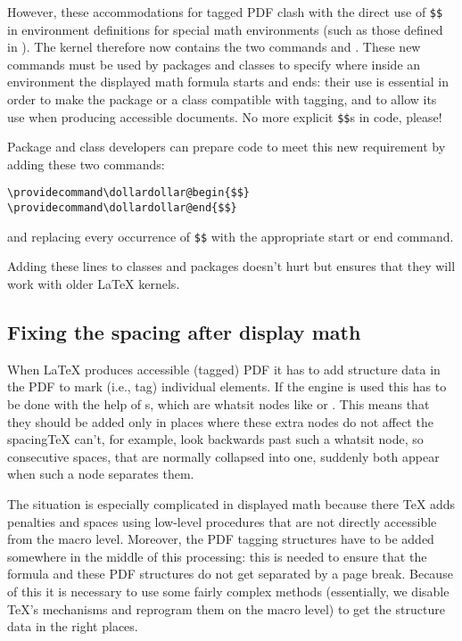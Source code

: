 \documentclass{ltnews}
\providecommand\Dash {\unskip \textemdash}
\providecommand\pdfTeX{\hologo{pdfTeX}}
\begin{document}
However, these accommodations for tagged PDF clash with the direct use
of \verb=$$= in environment definitions for special math environments
(such as those defined in ).  The kernel therefore now
contains the two commands  and
.  These new commands must be used by packages
and classes to specify where inside an environment the displayed math
formula starts and ends: their use is essential in order to make the
package or a class compatible with tagging, and to allow its use when
producing accessible documents.
%
No more explicit \texttt{\$\$}s in
code, please!

Package and class developers can prepare code to meet
this new requirement by adding these two commands:
\begin{verbatim}
\providecommand\dollardollar@begin{$$}
\providecommand\dollardollar@end{$$}
\end{verbatim}
and replacing every occurrence of \verb=$$= with the appropriate start
or end command.

Adding these  lines to classes and packages doesn't
hurt but ensures that they will work with older \LaTeX{} kernels.



\subsection{Fixing the spacing after display math}

When \LaTeX{} produces accessible (tagged) PDF it has to add structure
data in the PDF to mark (i.e., tag) individual elements. If the
\pdfTeX{} engine is used this has to be done with the help of
s, which are whatsit nodes like  or
. This means that they should be added only in places where
these extra nodes do not affect the spacing\Dash \TeX{} can't, for
example, look backwards past such a whatsit node, so consecutive
spaces, that are normally collapsed into one, suddenly both appear
when such a node separates them.

The situation is especially complicated in displayed math because
there \TeX{} adds penalties and spaces using low-level procedures that
are not directly accessible from the macro level.  Moreover, the PDF
tagging structures have to be added somewhere in the middle of this
processing: this is needed to ensure that the formula and these PDF
structures do not get separated by a page break. Because of this it is
necessary to use some fairly complex methods (essentially, we disable
\TeX's mechanisms and reprogram them on the macro level) to get the
structure data in the right places.
\end{document}

